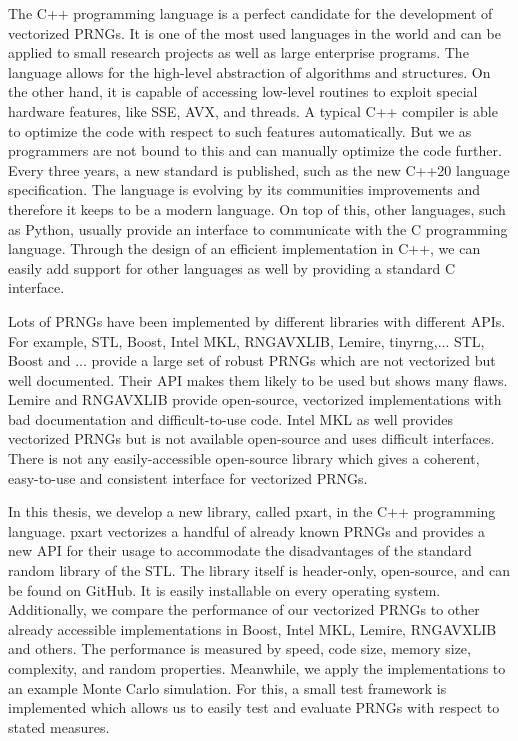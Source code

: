 \documentclass{stdlocal}
\begin{document}
The C++ programming language is a perfect candidate for the development of vectorized PRNGs.
It is one of the most used languages in the world and can be applied to small research projects as well as large enterprise programs.
The language allows for the high-level abstraction of algorithms and structures.
On the other hand, it is capable of accessing low-level routines to exploit special hardware features, like SSE, AVX, and threads.
A typical C++ compiler is able to optimize the code with respect to such features automatically.
But we as programmers are not bound to this and can manually optimize the code further.
Every three years, a new standard is published, such as the new C++20 language specification.
The language is evolving by its communities improvements and therefore it keeps to be a modern language.
On top of this, other languages, such as Python, usually provide an interface to communicate with the C programming language.
Through the design of an efficient implementation in C++, we can easily add support for other languages as well by providing a standard C interface.

Lots of PRNGs have been implemented by different libraries with different APIs.
For example, STL, Boost, Intel MKL, RNGAVXLIB, Lemire, tinyrng,...
STL, Boost and ... provide a large set of robust PRNGs which are not vectorized but well documented.
Their API makes them likely to be used but shows many flaws.
Lemire and RNGAVXLIB provide open-source, vectorized implementations with bad documentation and difficult-to-use code.
Intel MKL as well provides vectorized PRNGs but is not available open-source and uses difficult interfaces.
There is not any easily-accessible open-source library which gives a coherent, easy-to-use and consistent interface for vectorized PRNGs.

In this thesis, we develop a new library, called pxart, in the C++ programming language.
pxart vectorizes a handful of already known PRNGs and provides a new API for their usage to accommodate the disadvantages of the standard random library of the STL.
The library itself is header-only, open-source, and can be found on GitHub.
It is easily installable on every operating system.
Additionally, we compare the performance of our vectorized PRNGs to other already accessible implementations in Boost, Intel MKL, Lemire, RNGAVXLIB and others.
The performance is measured by speed, code size, memory size, complexity, and random properties.
Meanwhile, we apply the implementations to an example Monte Carlo simulation.
For this, a small test framework is implemented which allows us to easily test and evaluate PRNGs with respect to stated measures.

\end{document}

